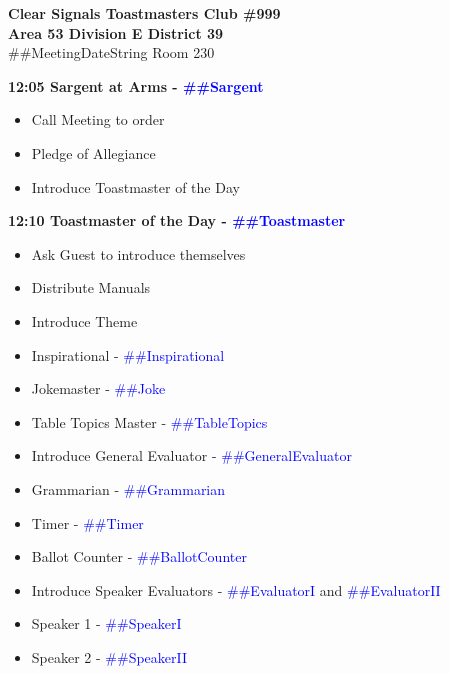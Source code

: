 \documentclass{article}
\newcommand{\meetingDateString}{##MeetingDateString}
\newcommand{\toastmaster}{##Toastmaster}
\newcommand{\sargent}{##Sargent}
\newcommand{\tableTopics}{##TableTopics}
\newcommand{\generalEvaluator}{##GeneralEvaluator}
\newcommand{\evaluatorI}{##EvaluatorI}
\newcommand{\evaluatorII}{##EvaluatorII}
\newcommand{\speakerI}{##SpeakerI}
\newcommand{\speakerII}{##SpeakerII}
\newcommand{\grammarian}{##Grammarian}
\newcommand{\timer}{##Timer}
\newcommand{\inspirational}{##Inspirational}
\newcommand{\ballotCounter}{##BallotCounter}
\newcommand{\joke}{##Joke}
\begin{document}
  \begin{spacing}{.8}
  \begin{center}
    {\bf Clear Signals Toastmasters Club \#999\\}
	{\bf Area 53 Division E District 39\\}
	\meetingDateString{} Room 230 \\ 
  \end{center}
  {\Large \bf12:05 Sargent at Arms - \textcolor{blue}{\sargent{}}}
  \begin{itemize}
    \item Call Meeting to order
    \item Pledge of Allegiance
    \item Introduce Toastmaster of the Day
  \end{itemize}
  {\Large \bf12:10 Toastmaster of the Day - \textcolor{blue}{\toastmaster{}}} 
  \begin{itemize}
    \item Ask Guest to introduce themselves
    \item Distribute Manuals
    \item Introduce Theme
    \item Inspirational - \textcolor{blue}{\inspirational{}}
    \item Jokemaster - \textcolor{blue}{\joke{}}
	\item Table Topics Master - \textcolor{blue}{\tableTopics{}}
    \item Introduce General Evaluator - \textcolor{blue}{\generalEvaluator{}}
	\item Grammarian - \textcolor{blue}{\grammarian{}}
    \item Timer - \textcolor{blue}{\timer{}}
    \item Ballot Counter - \textcolor{blue}{\ballotCounter{}}
    \item Introduce Speaker Evaluators - \textcolor{blue}{\evaluatorI{}} and \textcolor{blue}{\evaluatorII{}}
    \item Speaker 1 - \textcolor{blue}{\speakerI{}}
    \item Speaker 2 - \textcolor{blue}{\speakerII{}}
      \begin{description}

\end{description}
\end{itemize}
\end{spacing}
\end{document}
